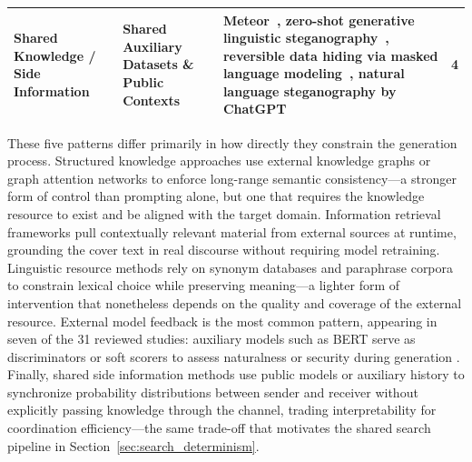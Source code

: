 \begin{table}[t]
\begin{tabular}{|>{\raggedright\arraybackslash}p{2cm}|>{\raggedright\arraybackslash}p{2cm}|>{\raggedright\arraybackslash}p{7cm}|c|}
    \hline
    Shared Knowledge / Side Information                 & Shared Auxiliary Datasets \& Public Contexts                                      & Meteor~\cite{kaptchuk2021meteor}, zero-shot generative linguistic steganography~\cite{lin2024zero}, reversible data hiding via masked language modeling~\cite{zheng2022general}, natural language steganography by ChatGPT~\cite{steinebach2024natural}                                                                                                                                                                                                                                                                                                                                                                                                                                                                                                                                & 4              \\
    \hline
  \end{tabular}
\end{table}

These five patterns differ primarily in how directly they constrain the generation process. Structured knowledge approaches \cite{li2024semantic,ding2023joint} use external knowledge graphs or graph attention networks to enforce long-range semantic consistency---a stronger form of control than prompting alone, but one that requires the knowledge resource to exist and be aligned with the target domain. Information retrieval frameworks \cite{wang2023hi,liao2024co} pull contextually relevant material from external sources at runtime, grounding the cover text in real discourse without requiring model retraining. Linguistic resource methods \cite{qiang2023natural} rely on synonym databases and paraphrase corpora to constrain lexical choice while preserving meaning---a lighter form of intervention that nonetheless depends on the quality and coverage of the external resource. External model feedback is the most common pattern, appearing in seven of the 31 reviewed studies: auxiliary models such as BERT serve as discriminators or soft scorers to assess naturalness or security during generation \cite{xiang2023cpg,munyer2024deeptextmark}. Finally, shared side information methods \cite{kaptchuk2021meteor,lin2024zero} use public models or auxiliary history to synchronize probability distributions between sender and receiver without explicitly passing knowledge through the channel, trading interpretability for coordination efficiency---the same trade-off that motivates the shared search pipeline in Section~\ref{sec:search_determinism}.


